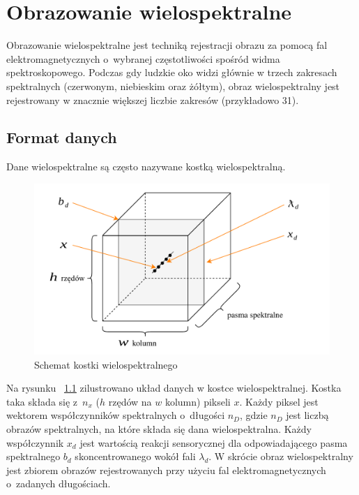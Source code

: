 
\chapter{Obrazowanie wielospektralne}
Obrazowanie wielospektralne jest techniką rejestracji obrazu za pomocą fal elektromagnetycznych o~wybranej częstotliwości spośród widma spektroskopowego. Podczas gdy ludzkie oko widzi głównie w trzech zakresach spektralnych (czerwonym, niebieskim oraz żółtym), obraz wielospektralny jest rejestrowany w znacznie większej liczbie zakresów (przykładowo 31).

\section{Format danych}
 Dane wielospektralne są często nazywane kostką wielospektralną. 

\begin{figure}[ht]
	\centering
		\includegraphics[width=0.75\linewidth]{rys02/multispectral-cube-vector}
	\caption{Schemat kostki wielospektralnego}
	\label{fig:multispectral-cube}	
\end{figure}

Na rysunku ~\ref{fig:multispectral-cube} zilustrowano układ danych w kostce wielospektralnej. Kostka taka składa się z~$n_x$ ($h$ rzędów na $w$ kolumn) pikseli $x$. Każdy piksel jest wektorem współczynników spektralnych o~długości  $n_D$, gdzie $n_D$ jest liczbą obrazów spektralnych, na które składa się dana wielospektralna. Każdy współczynnik $x_d$ jest wartością reakcji sensorycznej dla odpowiadającego pasma spektralnego $b_d$ skoncentrowanego wokół fali $\lambda_d$. W skrócie obraz wielospektralny jest zbiorem obrazów rejestrowanych przy użyciu fal elektromagnetycznych o~zadanych długościach. 


